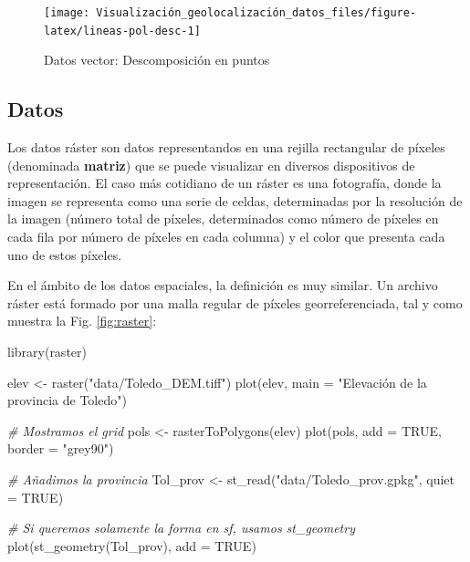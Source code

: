 \documentclass[
]{book}
\newenvironment{Shaded}{\begin{snugshade}}{\end{snugshade}}
\newcommand{\AttributeTok}[1]{\textcolor[rgb]{0.77,0.63,0.00}{#1}}
\newcommand{\CommentTok}[1]{\textcolor[rgb]{0.56,0.35,0.01}{\textit{#1}}}
\newcommand{\ConstantTok}[1]{\textcolor[rgb]{0.00,0.00,0.00}{#1}}
\newcommand{\FunctionTok}[1]{\textcolor[rgb]{0.00,0.00,0.00}{#1}}
\newcommand{\NormalTok}[1]{#1}
\newcommand{\OtherTok}[1]{\textcolor[rgb]{0.56,0.35,0.01}{#1}}
\newcommand{\StringTok}[1]{\textcolor[rgb]{0.31,0.60,0.02}{#1}}
\theoremstyle{definition}
\theoremstyle{definition}
\theoremstyle{definition}
\theoremstyle{definition}
\theoremstyle{remark}
\begin{document}
\begin{figure}

{\centering \texttt{[image: Visualización\_geolocalización\_datos\_files/figure-latex/lineas-pol-desc-1]} 

}

\caption{Datos vector: Descomposición en puntos}\label{fig:lineas-pol-desc}
\end{figure}

\hypertarget{raster}{%
\subsection{\texorpdfstring{Datos }{Datos }}\label{raster}}

Los datos ráster son datos representandos en una rejilla rectangular de píxeles
(denominada \textbf{matriz}) que se puede visualizar en diversos dispositivos de
representación. El caso más cotidiano de un ráster es una fotografía, donde la
imagen se representa como una serie de celdas, determinadas por la resolución de
la imagen (número total de píxeles, determinados como número de píxeles en cada
fila por número de píxeles en cada columna) y el color que presenta cada uno de
estos píxeles.

En el ámbito de los datos espaciales, la definición es muy similar. Un archivo
ráster está formado por una malla regular de píxeles georreferenciada, tal y
como muestra la Fig. \ref{fig:raster}:

\begin{Shaded}
\begin{Highlighting}[]

\FunctionTok{library}\NormalTok{(raster)}

\NormalTok{elev }\OtherTok{\textless{}{-}} \FunctionTok{raster}\NormalTok{(}\StringTok{"data/Toledo\_DEM.tiff"}\NormalTok{)}
\FunctionTok{plot}\NormalTok{(elev, }\AttributeTok{main =} \StringTok{"Elevación de la provincia de Toledo"}\NormalTok{)}

\CommentTok{\# Mostramos el grid}
\NormalTok{pols }\OtherTok{\textless{}{-}} \FunctionTok{rasterToPolygons}\NormalTok{(elev)}
\FunctionTok{plot}\NormalTok{(pols, }\AttributeTok{add =} \ConstantTok{TRUE}\NormalTok{, }\AttributeTok{border =} \StringTok{"grey90"}\NormalTok{)}

\CommentTok{\# Añadimos la provincia}
\NormalTok{Tol\_prov }\OtherTok{\textless{}{-}} \FunctionTok{st\_read}\NormalTok{(}\StringTok{"data/Toledo\_prov.gpkg"}\NormalTok{, }\AttributeTok{quiet =} \ConstantTok{TRUE}\NormalTok{)}

\CommentTok{\# Si queremos solamente la forma en sf, usamos st\_geometry}
\FunctionTok{plot}\NormalTok{(}\FunctionTok{st\_geometry}\NormalTok{(Tol\_prov), }\AttributeTok{add =} \ConstantTok{TRUE}\NormalTok{)}
\end{Highlighting}
\end{Shaded}
\end{document}
